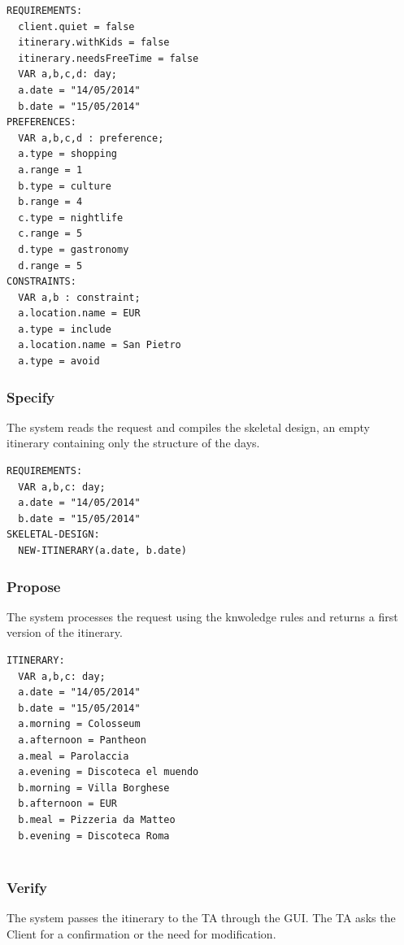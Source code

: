 \documentclass[11pt]{article} %
\begin{document}
\begin{lstlisting}[label=Rules,caption=Domain instance of the data inserted into the system,breaklines=true,mathescape=true]
REQUIREMENTS:
  client.quiet = false
  itinerary.withKids = false
  itinerary.needsFreeTime = false
  VAR a,b,c,d: day;
  a.date = "14/05/2014"
  b.date = "15/05/2014"
PREFERENCES:
  VAR a,b,c,d : preference;
  a.type = shopping
  a.range = 1
  b.type = culture
  b.range = 4
  c.type = nightlife
  c.range = 5
  d.type = gastronomy
  d.range = 5
CONSTRAINTS:
  VAR a,b : constraint;
  a.location.name = EUR
  a.type = include
  a.location.name = San Pietro
  a.type = avoid
\end{lstlisting}

\subsubsection{Specify}
The system reads the request and compiles the skeletal design, an empty itinerary containing only the structure of the days.

\begin{lstlisting}[breaklines=true,mathescape=true]
REQUIREMENTS:
  VAR a,b,c: day;
  a.date = "14/05/2014"
  b.date = "15/05/2014"
SKELETAL-DESIGN:
  NEW-ITINERARY(a.date, b.date)
\end{lstlisting}

\subsubsection{Propose}
The system processes the request using the knwoledge rules and returns a first version of the itinerary.

\begin{lstlisting}[breaklines=true,mathescape=true]
ITINERARY:
  VAR a,b,c: day;
  a.date = "14/05/2014"
  b.date = "15/05/2014"
  a.morning = Colosseum
  a.afternoon = Pantheon
  a.meal = Parolaccia
  a.evening = Discoteca el muendo
  b.morning = Villa Borghese
  b.afternoon = EUR
  b.meal = Pizzeria da Matteo
  b.evening = Discoteca Roma
  
\end{lstlisting}

\subsubsection{Verify}
The system passes the itinerary to the TA through the GUI. The TA asks the Client for a confirmation or the need for modification.
\end{document}
